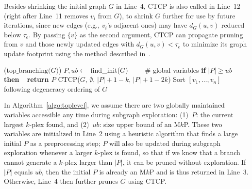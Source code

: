 \documentclass[sigconf,anonymous,review]{acmart}
\begin{document}
Besides shrinking the initial graph $G$ in Line~4, CTCP is also called in Line~12 (right after Line~11 removes $v_i$ from $G$), to shrink $G$ further for use by future iterations, since new edges (e.g., $v_i$'s adjacent ones) may have $d_G(u, v)$ reduced below $\tau_e$. By passing $\{v\}$ as the second argument, CTCP can propagate pruning from $v$ and those newly updated edges with $d_G(u, v)<\tau_e$ to minimize its graph update footprint using the method described in~\cite{kPlexS}.

\begin{algorithm}[!t]
    \DontPrintSemicolon
    \Begin($\text{top\_branching}{(}G{)}$){
        $P, ub \gets $ find\_init($G$)\ \ \ \ \ \# global variables\;\label{top:l1}
        {\bf if} $|P|\ge ub$ {\bf then\ \ return $P$}\;\label{top:l2}
        CTCP($G$, $\emptyset$, $|P|+1-k$, $|P|+1-2k$)\;\label{top:l3}
        Sort $[v_1,\dots, v_n]$ following degeneracy ordering of $G$\;\label{top:l4}
        \;
}
\caption{Top-Level Branching {($c = 2$)}}
\label{algo:toplevel}
\end{algorithm}
\setlength{\textfloatsep}{0pt}

\vspace{1mm}
 In Algorithm~\ref{algo:toplevel}, we assume there are two globally maintained variables accessible any time during subgraph exploration: (1)~$P$: the current largest $k$-plex found, and (2)~$ub$: size upper bound of an M$k$P. 
These two variables are initialized in Line~2 using a heuristic algorithm that finds a large initial $P$ as a preprocessing step; $P$ will also be updated during subgraph exploration whenever a larger $k$-plex is found, so that if we know that a branch cannot generate a $k$-plex larger than $|P|$, it can be pruned without exploration. If $|P|$ equals $ub$, then the initial $P$ is already an M$k$P and is thus returned in Line~3. Otherwise, Line~4 then further prunes $G$ using CTCP.
\end{document}
